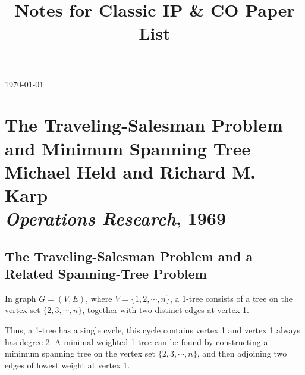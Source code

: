 
\title{Notes for Classic IP \& CO Paper List}

	\maketitle
	\today

	\clearpage
	\thispagestyle{plain}
	\par{}

	\tableofcontents


	\chapter[The Traveling-Salesman Problem and Minimum Spanning Tree]
		{The Traveling-Salesman Problem and Minimum Spanning Tree \\[\bigskipamount]
		\Large Michael Held and Richard M. Karp \\[\bigskipamount]
		\large \textit{Operations Research}, 1969}

		\section{The Traveling-Salesman Problem and a Related Spanning-Tree Problem}
			\begin{definition}[1-tree]
				In graph $G = (V, E)$, where $V = \{1, 2, \cdots, n\}$, a 1-tree consists of a tree on the vertex set $\{2, 3, \cdots, n\}$, together with two distinct edges at vertex 1.
			\end{definition}

			Thus, a 1-tree has a single cycle, this cycle contains vertex 1 and vertex 1 always has degree 2. A minimal weighted 1-tree can be found by constructing a minimum spanning tree on the vertex set $\{2, 3, \cdots, n\}$, and then adjoining two edges of lowest weight at vertex 1.

